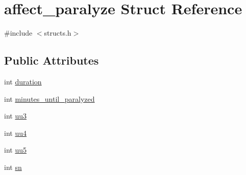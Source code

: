 \hypertarget{structaffect__paralyze}{\section{affect\-\_\-paralyze Struct Reference}
\label{structaffect__paralyze}
}


{\ttfamily \#include $<$structs.\-h$>$}

\subsection*{Public Attributes}
\begin{DoxyCompactItemize}
\item 
int \hyperlink{structaffect__paralyze_adf1d5a35c8008cbad0ca5ce8698bb0ce}{duration}
\item 
int \hyperlink{structaffect__paralyze_a04d90c64680ac57d6ef11d1bdea032c5}{minutes\-\_\-until\-\_\-paralyzed}
\item 
int \hyperlink{structaffect__paralyze_a0680ad907c4ea80ef81bcbda834c4105}{uu3}
\item 
int \hyperlink{structaffect__paralyze_a82390b9ea39b080722ba847b7436d7e0}{uu4}
\item 
int \hyperlink{structaffect__paralyze_aae65e45a3da12fcd435b53ea0af8d630}{uu5}
\item 
int \hyperlink{structaffect__paralyze_aa401701137676487fbdea56cbd0f2753}{sn}
\end{DoxyCompactItemize}


